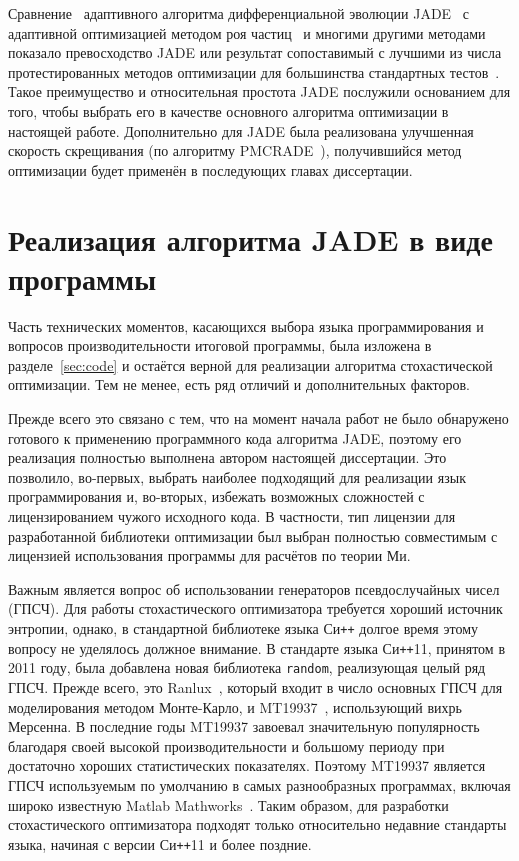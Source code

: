 Сравнение~\cite{Gong-compare-EA-2014,Kang-compare-EA-RABC-2011}
адаптивного алгоритма дифференциальной эволюции
JADE~\cite{Jingqiao-JADE-2009} с адаптивной оптимизацией методом роя
частиц~\cite{Zhan-APSO-2008} и многими другими методами показало
превосходство JADE или результат сопоставимый с лучшими из числа
протестированных методов оптимизации для большинства стандартных
тестов~\cite{Schwefel-1981,Rosenbrock-1960,Muhlenbein-1991,back-1996,Griewank-1981}.
Такое преимущество и относительная простота JADE послужили
основанием для того, чтобы выбрать его в качестве основного алгоритма 
оптимизации в настоящей работе. Дополнительно для JADE была
реализована улучшенная скорость скрещивания (по алгоритму
PMCRADE~\cite{Li-PMCRADE-2011}), получившийся метод оптимизации будет
применён в последующих главах диссертации.



\section{Реализация алгоритма JADE в виде программы}
\label{sec:jade}

Часть технических моментов, касающихся выбора языка программирования и
вопросов производительности итоговой программы, была изложена в
разделе~\ref{sec:code} и остаётся верной для реализации алгоритма
стохастической оптимизации. Тем не менее, есть ряд отличий и
дополнительных факторов.

Прежде всего это связано с тем, что на момент начала работ не было
обнаружено готового к применению программного кода алгоритма JADE, поэтому его
реализация полностью выполнена автором настоящей диссертации. Это
позволило, во-первых, выбрать наиболее подходящий для реализации язык
программирования и, во-вторых, избежать возможных сложностей с
лицензированием чужого исходного кода. В частности, тип лицензии для
разработанной библиотеки оптимизации был выбран полностью
совместимым с лицензией использования программы для расчётов по
теории Ми.

Важным является вопрос об использовании генераторов псевдослучайных
чисел (ГПСЧ). Для работы стохастического оптимизатора требуется
хороший источник энтропии, однако, в стандартной библиотеке языка
Си\texttt{++} долгое время этому вопросу не уделялось должное
внимание. В стандарте языка Си\texttt{++}11, принятом в 2011 году, была
добавлена новая библиотека \verb+random+, реализующая целый ряд
ГПСЧ. Прежде всего, это Ranlux~\cite{Luscher-RNG-Ranlux-1994}, который
входит в число основных ГПСЧ для моделирования методом Монте-Карло, и
MT19937~\cite{Matsumoto-RNG-MT-1998}, использующий вихрь Мерсенна. В
последние годы MT19937 завоевал значительную популярность благодаря
своей высокой производительности и большому периоду при достаточно
хороших статистических показателях. Поэтому MT19937 является ГПСЧ
используемым по умолчанию в самых разнообразных программах, включая
широко известную Matlab Mathworks~\cite{Matlab-web}. Таким образом, для разработки
стохастического оптимизатора подходят только относительно недавние
стандарты языка, начиная с версии Си\texttt{++}11 и более поздние.

